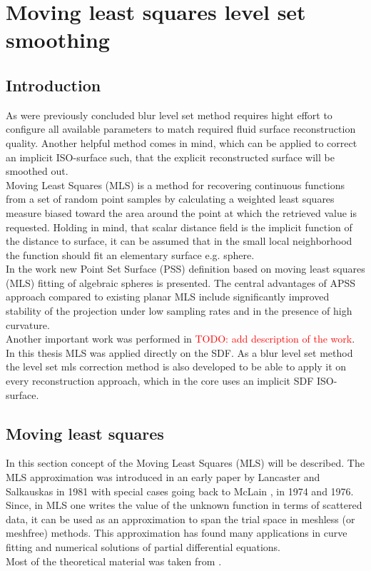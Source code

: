 \chapter{Moving least squares level set smoothing}
\section{Introduction}
As were previously concluded blur level set method requires hight effort to configure all available parameters to match required fluid surface reconstruction quality. Another helpful method comes in mind, which can be applied to correct an implicit ISO-surface such, that the explicit reconstructed surface will be smoothed out.\\
Moving Least Squares (MLS) is a method for recovering continuous functions from a set of random point samples by calculating a weighted least squares measure biased toward the area around the point at which the retrieved value is requested. Holding in mind, that scalar distance field is the implicit function of the distance to surface, it can be assumed that in the small local neighborhood the function should fit an elementary surface e.g. sphere.\\
In the work \cite{Apss} new Point Set Surface (PSS) definition based on moving least squares (MLS) fitting of algebraic spheres is presented. The central advantages of APSS approach compared to existing planar MLS include significantly improved stability of the projection under low sampling rates and in the presence of high curvature.\\
Another important work was performed in \cite{PssLkr} \textcolor{red}{TODO: add description of the work}.\\
In this thesis MLS was applied directly on the SDF. As a blur level set method the level set mls correction method is also developed to be able to apply it on every reconstruction approach, which in the core uses an implicit SDF ISO-surface.  
\section{Moving least squares}
In this section concept of the Moving Least Squares (MLS) will be described. The MLS approximation was introduced in an early paper by Lancaster and Salkauskas  \cite{MLSSalkauskas} in 1981 with special cases going back to McLain  \cite{MLSMcLain1}, \cite{MLSMcLain2} in 1974 and 1976. Since, in MLS one writes the value of the unknown function in terms of scattered data, it can be used as an approximation to span the trial space in meshless (or meshfree) methods. This approximation has found many applications in curve fitting and numerical solutions of partial differential equations.\\
Most of the theoretical material was taken from \cite{MLSIntro}.
